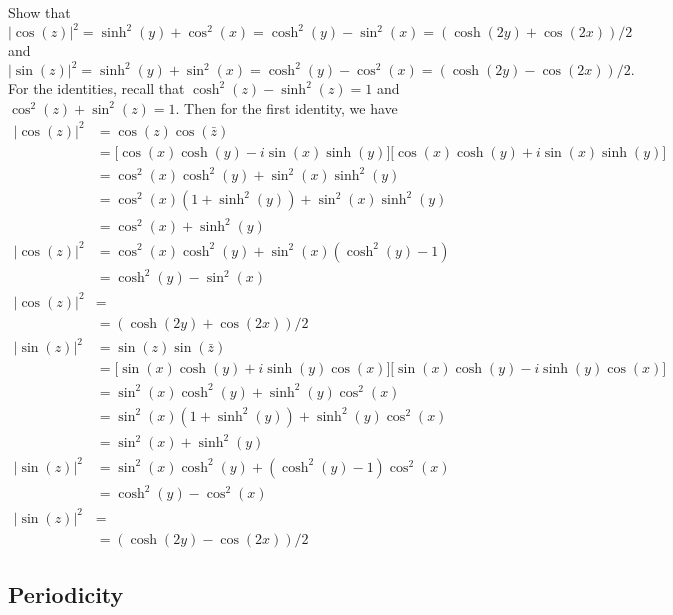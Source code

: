 \begin{exercise}
  Show that
  \[
  \lvert\cos(z)\rvert^2 = \sinh^2(y) + \cos^2(x) = \cosh^2(y) - \sin^2(x) =
  (\cosh(2y) + \cos(2x))/2
  \]
  and
  \[
  \lvert\sin(z)\rvert^2 = \sinh^2(y) + \sin^2(x) = \cosh^2(y) - \cos^2(x) =
  (\cosh(2y) - \cos(2x))/2.
  \]
  For the identities, recall that \(\cosh^2(z) - \sinh^2(z) = 1\) and
  \(\cos^2(z) + \sin^2(z) = 1\).
  Then for the first identity, we have
  \begin{align*}
    \lvert\cos(z)\rvert^2 & = \cos(z)\cos(\bar{z})\\
                          & = \bigl[\cos(x)\cosh(y) - i\sin(x)\sinh(y)\bigr]
                            \bigl[\cos(x)\cosh(y) + i\sin(x)\sinh(y)\bigr]\\
                          & = \cos^2(x)\cosh^2(y) + \sin^2(x)\sinh^2(y)\\
                          & = \cos^2(x)(1 + \sinh^2(y)) + \sin^2(x)\sinh^2(y)\\
                          & = \cos^2(x) + \sinh^2(y)\\
    \lvert\cos(z)\rvert^2 & = \cos^2(x)\cosh^2(y) + \sin^2(x)(\cosh^2(y) - 1)\\
                          & = \cosh^2(y) - \sin^2(x)\\
    \lvert\cos(z)\rvert^2 & = \\
                          & = (\cosh(2y) + \cos(2x))/2\\
    \lvert\sin(z)\rvert^2 & = \sin(z)\sin(\bar{z})\\
                          & = \bigl[\sin(x)\cosh(y) + i\sinh(y)\cos(x)\bigr]
                            \bigl[\sin(x)\cosh(y) - i\sinh(y)\cos(x)\bigr]\\
                          & = \sin^2(x)\cosh^2(y) + \sinh^2(y)\cos^2(x)\\
                          & = \sin^2(x)(1 + \sinh^2(y)) + \sinh^2(y)\cos^2(x)\\
                          & = \sin^2(x) + \sinh^2(y)\\
    \lvert\sin(z)\rvert^2 & = \sin^2(x)\cosh^2(y) + (\cosh^2(y) - 1)\cos^2(x)\\
                          & = \cosh^2(y) - \cos^2(x)\\
    \lvert\sin(z)\rvert^2 & = \\
                          & = (\cosh(2y) - \cos(2x))/2
  \end{align*}
\end{exercise}

\subsection{Periodicity}

